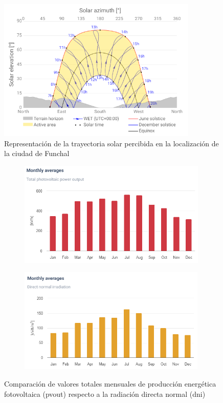 \begin{figure}[H]
    \centering
    \includegraphics[width=0.85\textwidth]{img/diseno/azimut.png}
    \caption{Representación de la trayectoria solar percibida en la localización de la ciudad de Funchal \cite{globalsolar}}
    \label{fig:azimut}
\end{figure}

\vspace{3mm}

\begin{figure}[H]
    \centering    
    \begin{subfigure}{0.5\linewidth}
        \centering
        \includegraphics[width=\linewidth,height=5cm]{img/diseno/averagepvout.png}
        \label{fig:averagepvout}
    \end{subfigure}\hfill
    \begin{subfigure}{0.5\linewidth}
        \centering
        \includegraphics[width=\linewidth,height=5cm]{img/diseno/averagedni.png}
        \label{fig:averagedni}
    \end{subfigure}    
    \caption{Comparación de valores totales mensuales de producción energética fotovoltaica (\acrshort{pvout}) respecto a la radiación directa normal (\acrshort{dni}) \cite{globalsolar}}
    \label{fig:average}
\end{figure}

